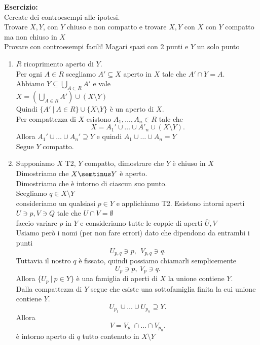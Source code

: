 \documentclass[12px]{article}
\begin{document}
\textbf{Esercizio:}\\
Cercate dei controesempi alle ipotesi.\\
Trovare $X,Y$, con $Y$ chiuso e non compatto e trovare $X,Y$ con  $X $ con $Y$ compatto ma non chiuso in $X$\\
Provare con controesempi facili! Magari spazi con 2 punti e  $Y$ un solo punto
\begin{dimo}
	\text{}
	\begin{enumerate}
		\item $R$ ricoprimento aperto di $Y$. \\
			Per ogni $A\in R$ scegliamo $A'\subseteq X$ aperto in  $X$ tale che $A'\cap Y = A$.\\
			Abbiamo $Y\subseteq \bigcup_{A\subset R}A'$ e vale\\
			$X = \left( \bigcup^{}_{A\in R}A' \right) \cup (X\setminus Y)$\\
			Quindi $\{A'\ | \ A\in R\}\cup\{X\setminus Y\}$ è un aperto di $X$.\\
			Per compattezza di  $X$ esistono $A_1,\ldots,A_n\in R$ tale che 
			\[
			 X = A_1'\cup\ldots\cup A'_n\cup (X\setminus Y)
			.\]
			Allora $A_1'\cup\ldots\cup A_n'\supseteq Y$ e quindi $A_1\cup\ldots\cup A_n = Y$ \\
			Segue $Y$ compatto.\\
		\item 
			Supponiamo $X$ T2, $Y$ compatto, dimostrare che  $Y$ è chiuso in $X$\\
			Dimostriamo che  $X\semtinus Y$ è aperto.\\
			Dimostriamo che è intorno di ciascun suo punto.\\
			Scegliamo $q\in X\setminus Y$\\
			consideriamo un qualsiasi  $p\in Y$ e applichiamo T2. Esistono intorni aperti $U\ni p, V\ni Q$ tale che  $U\cap V= \emptyset$\\
			faccio variare  $p$ in $Y$ e consideriamo tutte le coppie di aperti $\overline U, V$ \\
			Usiamo però i nomi (per non fare errori) dato che dipendono da entrambi i punti
			\[
				U_{p,q} \ni p , \ \ V_{p,q}\ni q
			.\] 
			Tuttavia il nostro $q$ è fissato, quindi possiamo chiamarli semplicemente \[
			U_p\ni p, \ V_p\ni q
			.\] 
			Allora $\{U_p \ | \ p\in Y\}$ è una famiglia di aperti di  $X$ la unione contiene $Y$.\\
			Dalla compattezza di $Y$ segue che esiste una sottofamiglia finita la cui unione contiene $Y$.
		\[U_{p_1}\cup \ldots\cup U_{p_n}\supseteq Y.\]
		Allora
		\[
			V = V_{p_1}\cap\ldots\cap V_{p_n}
		.\] 
		è intorno aperto di $q$ tutto contenuto in $X\setminus Y$
	\end{enumerate}
\end{dimo}
\end{document}
